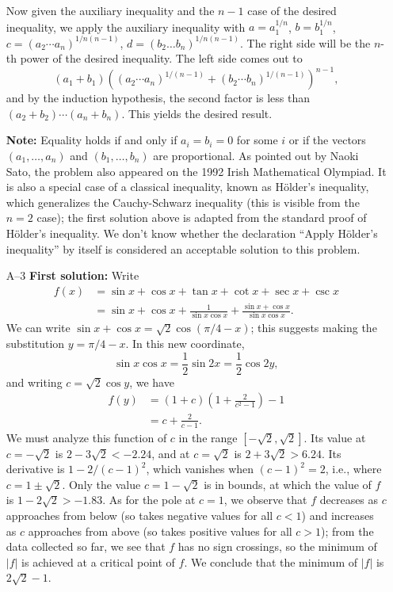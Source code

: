 \documentclass[amssymb,twocolumn,pra,10pt,aps]{revtex4-1}
\begin{document}
\begin{itemize}
Now given the auxiliary inequality and the $n-1$ case of the desired
inequality, we apply the auxiliary inequality with $a = a_1^{1/n}$,
$b = b_1^{1/n}$, $c = (a_2 \cdots a_n)^{1/n(n-1)}$,
$d = (b_2 \dots b_n)^{1/n(n-1)}$. The right side will be the $n$-th
power of the desired inequality. The left side comes out to
\[
(a_1 + b_1)((a_2 \cdots a_n)^{1/(n-1)} + (b_2 \cdots b_n)^{1/(n-1)})^{n-1},
\]
and by the induction hypothesis, the second factor is less than
$(a_2 + b_2)\cdots(a_n+b_n)$. This yields the desired result.

\textbf{Note:}
Equality holds if and only if $a_i=b_i=0$ for some $i$ or if the vectors
$(a_1, \dots, a_n)$ and $(b_1, \dots, b_n)$ are proportional.
As pointed out by Naoki Sato, the problem also appeared on the 1992
Irish Mathematical Olympiad.
It is also a special case of a classical inequality,
known as H\"older's inequality, which generalizes the
Cauchy-Schwarz inequality (this is visible from the $n=2$ case); the
first solution above is adapted from the standard proof of H\"older's
inequality.
We don't know whether the declaration
``Apply H\"older's inequality'' by itself is considered
an acceptable solution to this problem.

\item[A--3]
\textbf{First solution:}
Write
\begin{align*}
f(x) &= \sin x + \cos x + \tan x + \cot x + \sec x + \csc x \\
&= \sin x + \cos x + \frac{1}{\sin x \cos x} + \frac{\sin x + \cos x}{\sin x
\cos x}.
\end{align*}
We can write $\sin x + \cos x = \sqrt{2} \cos(\pi/4 - x)$; this suggests
making the substitution $y = \pi/4 - x$. In this new coordinate,
\[
\sin x \cos x = \frac{1}{2} \sin 2x = \frac{1}{2} \cos 2y,
\]
and writing $c = \sqrt{2} \cos y$, we have
\begin{align*}
f(y) &= (1 + c)\left(1 + \frac{2}{c^2 -1} \right) - 1 \\
&= c + \frac{2}{c - 1}.
\end{align*}
We must analyze this function of $c$ in the range $[-\sqrt{2}, \sqrt{2}]$.
Its value at $c=-\sqrt{2}$ is $2 - 3\sqrt{2} < -2.24$, and at
$c = \sqrt{2}$ is $2 + 3\sqrt{2}>6.24$.
Its derivative is $1 - 2/(c-1)^2$, which vanishes when
$(c-1)^2 = 2$, i.e., where $c = 1 \pm \sqrt{2}$. Only the value
$c = 1 - \sqrt{2}$ is in bounds, at which
the value of $f$ is $1-2\sqrt{2} > -1.83$. As for the pole at $c=1$,
we observe that $f$ decreases as $c$ approaches from below
(so takes negative values for all $c<1$) and increases as $c$
approaches from above (so takes positive values for all $c>1$); from
the data collected so far, we see that $f$ has no sign crossings, so
the minimum of $|f|$ is achieved at a critical point of $f$.
We conclude that the minimum of $|f|$ is $2 \sqrt{2} - 1$.


\end{itemize}
\end{document}
